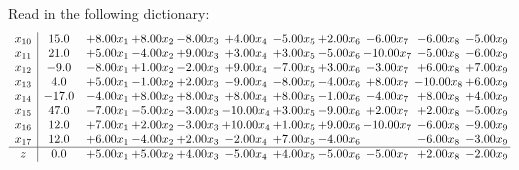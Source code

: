 \documentclass[9pt]{article}
\begin{document}
Read in the following dictionary:
\[\begin{array}{c| c c@{\hskip 2pt} c@{\hskip 2pt} c@{\hskip 2pt} c@{\hskip 2pt} c@{\hskip 2pt} c@{\hskip 2pt} c@{\hskip 2pt} c@{\hskip 2pt} c@{\hskip 2pt} }
 x_{10}   &  15.0 & +  8.00 x_{1} & +  8.00 x_{2} & -8.00 x_{3} & +  4.00 x_{4} & -5.00 x_{5} & +  2.00 x_{6} & -6.00 x_{7} & -6.00 x_{8} & -5.00 x_{9}\\
 x_{11}   &  21.0 & +  5.00 x_{1} & -4.00 x_{2} & +  9.00 x_{3} & +  3.00 x_{4} & +  3.00 x_{5} & -5.00 x_{6} & -10.00 x_{7} & -5.00 x_{8} & -6.00 x_{9}\\
 x_{12}   &  -9.0 & -8.00 x_{1} & +  1.00 x_{2} & -2.00 x_{3} & +  9.00 x_{4} & -7.00 x_{5} & +  3.00 x_{6} & -3.00 x_{7} & +  6.00 x_{8} & +  7.00 x_{9}\\
 x_{13}   &  4.0 & +  5.00 x_{1} & -1.00 x_{2} & +  2.00 x_{3} & -9.00 x_{4} & -8.00 x_{5} & -4.00 x_{6} & +  8.00 x_{7} & -10.00 x_{8} & +  6.00 x_{9}\\
 x_{14}   &  -17.0 & -4.00 x_{1} & +  8.00 x_{2} & +  8.00 x_{3} & +  8.00 x_{4} & +  8.00 x_{5} & -1.00 x_{6} & -4.00 x_{7} & +  8.00 x_{8} & +  4.00 x_{9}\\
 x_{15}   &  47.0 & -7.00 x_{1} & -5.00 x_{2} & -3.00 x_{3} & -10.00 x_{4} & +  3.00 x_{5} & -9.00 x_{6} & +  2.00 x_{7} & +  2.00 x_{8} & -5.00 x_{9}\\
 x_{16}   &  12.0 & +  7.00 x_{1} & +  2.00 x_{2} & -3.00 x_{3} & + 10.00 x_{4} & +  1.00 x_{5} & +  9.00 x_{6} & -10.00 x_{7} & -6.00 x_{8} & -9.00 x_{9}\\
 x_{17}   &  12.0 & +  6.00 x_{1} & -4.00 x_{2} & +  2.00 x_{3} & -2.00 x_{4} & +  7.00 x_{5} & -4.00 x_{6} &   & -6.00 x_{8} & -3.00 x_{9}\\
\hline
z    &  0.0 & +  5.00 x_{1} & +  5.00 x_{2} & +  4.00 x_{3} & -5.00 x_{4} & +  4.00 x_{5} & -5.00 x_{6} & -5.00 x_{7} & +  2.00 x_{8} & -2.00 x_{9}\\
\end{array}\]
\end{document}
